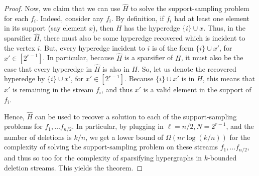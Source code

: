 \documentclass[11pt]{article}
\theoremstyle{definition}
\begin{document}
\begin{proof}
    Now, we claim that we can use $\hat{H}$ to solve the support-sampling problem for each $f_i$. Indeed, consider any $f_i$. By definition, if $f_i$ had at least one element in its support (say element $x$), then $H$ has the hyperedge $\{ i \} \cup x$. Thus, in the sparsifier $\hat{H}$, there must also be some hyperedge recovered which is incident to the vertex $i$. But, every hyperedge incident to $i$ is of the form $\{i \} \cup x'$, for $x' \in [2^{r-1}]$. In particular, because $\hat{H}$ is a sparsifier of $H$, it must also be the case that every hyperedge in $\hat{H}$ is also in $H$. So, let us denote the recovered hyperedge by $\{i \} \cup x'$, for $x' \in [2^{r-1}]$. Because $\{i \} \cup x'$ is in $H$, this means that $x'$ is remaining in the stream $f_i$, and thus $x'$ is a valid element in the support of $f_i$.

    Hence, $\hat{H}$ can be used to recover a solution to each of the support-sampling problems for $f_1, \dots f_{n/2}$. In particular, by plugging in $\ell = n/2, N = 2^{r-1}$, and the number of deletions is $k/n$, we get a lower bound of $\Omega(n r \log(k/n))$ for the complexity of solving the support-sampling problem on these streams $f_1, \dots f_{n/2}$, and thus so too for the complexity of sparsifying hypergraphs in $k$-bounded deletion streams. This yields the theorem.
\end{proof}

 

\appendix
\end{document}
